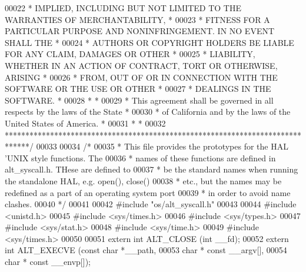 \begin{DoxyCode}
00022 \textcolor{comment}{* IMPLIED, INCLUDING BUT NOT LIMITED TO THE WARRANTIES OF MERCHANTABILITY,    *}
00023 \textcolor{comment}{* FITNESS FOR A PARTICULAR PURPOSE AND NONINFRINGEMENT. IN NO EVENT SHALL THE *}
00024 \textcolor{comment}{* AUTHORS OR COPYRIGHT HOLDERS BE LIABLE FOR ANY CLAIM, DAMAGES OR OTHER      *}
00025 \textcolor{comment}{* LIABILITY, WHETHER IN AN ACTION OF CONTRACT, TORT OR OTHERWISE, ARISING     *}
00026 \textcolor{comment}{* FROM, OUT OF OR IN CONNECTION WITH THE SOFTWARE OR THE USE OR OTHER         *}
00027 \textcolor{comment}{* DEALINGS IN THE SOFTWARE.                                                   *}
00028 \textcolor{comment}{*                                                                             *}
00029 \textcolor{comment}{* This agreement shall be governed in all respects by the laws of the State   *}
00030 \textcolor{comment}{* of California and by the laws of the United States of America.              *}
00031 \textcolor{comment}{*                                                                             *}
00032 \textcolor{comment}{******************************************************************************/}
00033 
00034 \textcolor{comment}{/*}
00035 \textcolor{comment}{ * This file provides the prototypes for the HAL 'UNIX style functions. The}
00036 \textcolor{comment}{ * names of these functions are defined in alt\_syscall.h. THese are defined to}
00037 \textcolor{comment}{ * be the standard names when running the standalone HAL, e.g. open(), close()}
00038 \textcolor{comment}{ * etc., but the names may be redefined as a part of an operating system port}
00039 \textcolor{comment}{ * in order to avoid name clashes.}
00040 \textcolor{comment}{ */}
00041 
00042 \textcolor{preprocessor}{#include "os/alt_syscall.h"}
00043 
00044 \textcolor{preprocessor}{#include <unistd.h>}
00045 \textcolor{preprocessor}{#include <sys/times.h>}
00046 \textcolor{preprocessor}{#include <sys/types.h>}
00047 \textcolor{preprocessor}{#include <sys/stat.h>}
00048 \textcolor{preprocessor}{#include <sys/time.h>}
00049 \textcolor{preprocessor}{#include <sys/times.h>}
00050 
00051 \textcolor{keyword}{extern} \textcolor{keywordtype}{int}     ALT_CLOSE (\textcolor{keywordtype}{int} \_\_fd);
00052 \textcolor{keyword}{extern} \textcolor{keywordtype}{int}     ALT_EXECVE (\textcolor{keyword}{const} \textcolor{keywordtype}{char} *\_\_path, 
00053                            \textcolor{keywordtype}{char} * \textcolor{keyword}{const} \_\_argv[], 
00054                            \textcolor{keywordtype}{char} * \textcolor{keyword}{const} \_\_envp[]);

\end{DoxyCode}
